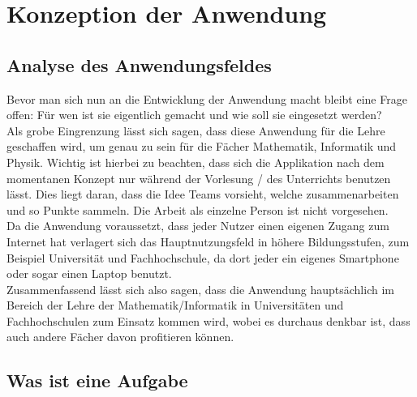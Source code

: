 \chapter{Konzeption der Anwendung}

\section{Analyse des Anwendungsfeldes}

Bevor man sich nun an die Entwicklung der Anwendung macht bleibt eine Frage offen: Für wen ist sie eigentlich gemacht und wie soll sie eingesetzt werden? \\
Als grobe Eingrenzung lässt sich sagen, dass diese Anwendung für die Lehre geschaffen wird, um genau zu sein für die Fächer Mathematik, Informatik und Physik. Wichtig ist hierbei zu beachten, dass sich die Applikation nach dem momentanen Konzept nur während der Vorlesung / des Unterrichts benutzen lässt. Dies liegt daran, dass die Idee Teams vorsieht, welche zusammenarbeiten und so Punkte sammeln. Die Arbeit als einzelne Person ist nicht vorgesehen. \\
Da die Anwendung voraussetzt, dass jeder Nutzer einen eigenen Zugang zum Internet hat verlagert sich das Hauptnutzungsfeld in höhere Bildungsstufen, zum Beispiel Universität und Fachhochschule, da dort jeder ein eigenes Smartphone oder sogar einen Laptop benutzt. \\
Zusammenfassend lässt sich also sagen, dass die Anwendung hauptsächlich im Bereich der Lehre der Mathematik/Informatik in Universitäten und Fachhochschulen zum Einsatz kommen wird, wobei es durchaus denkbar ist, dass auch andere Fächer davon profitieren können.

\section{Was ist eine Aufgabe}

